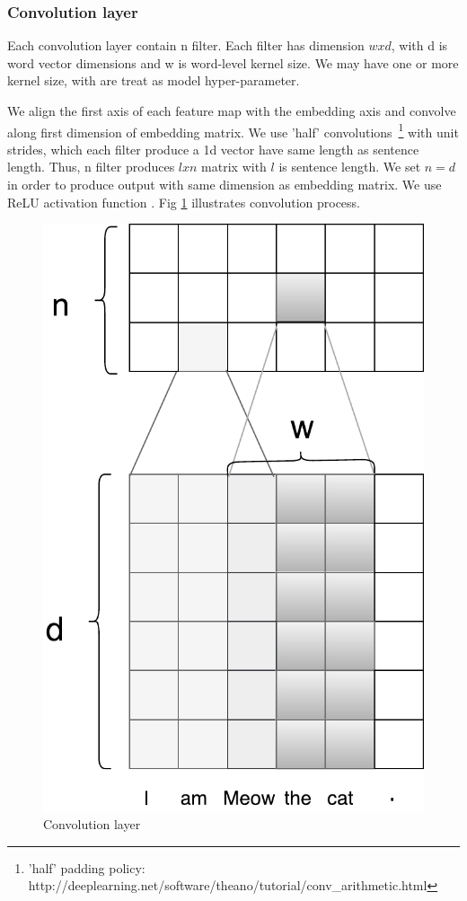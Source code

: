\subsubsection{Convolution layer} \label{sec:conv1c}
Each convolution layer contain n filter. Each filter has dimension $w x d$, with d is word vector dimensions and w is word-level kernel size. We may have one or more kernel size, with are treat as model hyper-parameter. 

We align the first axis of each feature map with the embedding axis and convolve along first dimension of embedding matrix. 
We use 'half' convolutions~\footnote{'half' padding policy: http://deeplearning.net/software/theano/tutorial/conv\_arithmetic.html} with unit strides, which each filter produce a 1d vector have same length as sentence length. 
Thus, n filter produces $l x n$ matrix with $l$ is sentence length. We set $n = d$ in order to produce output with same dimension as embedding matrix. We use ReLU activation function \cite{hahnloser2000digital}. Fig \ref{fig:convlayer} illustrates convolution process. 



\begin{figure}[H]
	\centering
	\includegraphics[width=0.6\linewidth]{figure/convlayer}
	\caption[Convolution layer]{Convolution layer}
	\label{fig:convlayer}
\end{figure}

